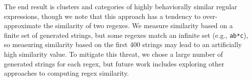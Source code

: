 The end result is clusters and categories of highly behaviorally similar regular expressions, though we note that this approach has a tendency to over-approximate the similarity of two regexes. We measure similarity based on a finite set of generated strings, but some regexes  match an infinite set (e.g., \verb!ab*c!), so measuring similarity based on the first 400 strings may lead to an artificially high similarity value. To mitigate this threat, we chose a large number of generated strings for each regex, but future work includes exploring other approaches to computing regex similarity.


%
%

